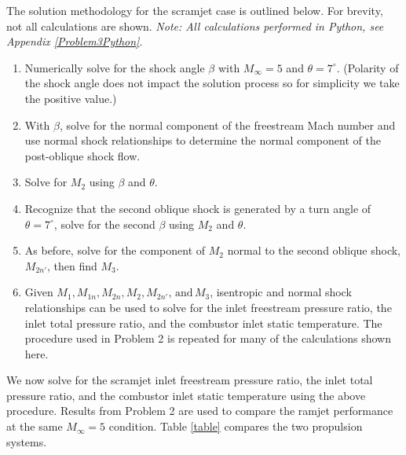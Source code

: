\documentclass[../main.tex]{subfiles}
\begin{document}
\solution{}

The solution methodology for the scramjet case is outlined below.
For brevity, not all calculations are shown.
\textit{Note: All calculations performed in Python, see Appendix \ref{Problem3Python}}.

\begin{enumerate}

    \item Numerically solve for the shock angle \(\beta\) with \(M_\infty=5\) and \(\theta=7^\circ\). (Polarity of the shock angle does not impact the solution process so for simplicity we take the positive value.)

    \item With \(\beta\), solve for the normal component of the freestream Mach number and use normal shock relationships to determine the normal component of the post-oblique shock flow.

    \item Solve for \(M_2\) using \(\beta\) and \(\theta\).
    
    \item Recognize that the second oblique shock is generated by a turn angle of \(\theta=7^\circ\), solve for the second \(\beta\) using \(M_2\) and \(\theta\).
    
    \item As before, solve for the component of \(M_2\) normal to the second oblique shock, \(M_{2n'}\), then find \(M_3\).

    \item Given \(M_1, M_{1n}, M_{2n}, M_2, M_{2n'}, \,\textrm{and}\, M_3\), isentropic and normal shock relationships can be used to solve for the inlet freestream pressure ratio, the inlet total pressure ratio, and the combustor inlet static temperature.
        The procedure used in Problem 2 is repeated for many of the calculations shown here.

\end{enumerate}

We now solve for the scramjet inlet freestream pressure ratio, the inlet total pressure ratio, and the combustor inlet static temperature using the above procedure.
Results from Problem 2 are used to compare the ramjet performance at the same \(M_\infty=5\) condition.
Table \ref{table} compares the two propulsion systems.
\end{document}

